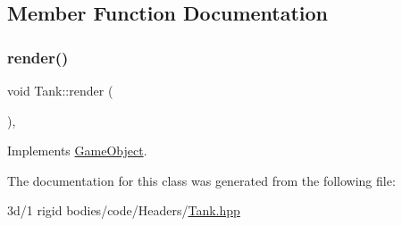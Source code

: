 \subsection{Member Function Documentation}
\mbox{\label{class_tank_a9628f999ddc963311cebf069da363d5c}} 
\subsubsection{\texorpdfstring{render()}{render()}}
{\footnotesize\ttfamily void Tank\+::render (\begin{DoxyParamCaption}{ }\end{DoxyParamCaption})\hspace{0.3cm}{\ttfamily [override]}, {\ttfamily [virtual]}}



Implements \mbox{\hyperlink{class_game_object_adee58d508cfa907162d1192a25dc21b9}{Game\+Object}}.



The documentation for this class was generated from the following file\+:\begin{DoxyCompactItemize}
\item 
3d/1 rigid bodies/code/\+Headers/\mbox{\hyperlink{_tank_8hpp}{Tank.\+hpp}}\end{DoxyCompactItemize}
